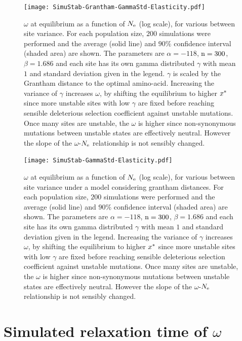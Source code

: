 \begin{figure}[H]
	\centering
	\texttt{[image: SimuStab-Grantham-GammaStd-Elasticity.pdf]}
	\caption[Effect of site variance on the susceptibility]{
	$\omega$ at equilibrium as a function of $N_{\mathrm{e}}$ (log scale), for various between site variance.
	For each population size, $200$ simulations were performed and the average (solid line) and $90\%$ confidence interval (shaded area) are shown.
	The parameters are $\alpha=-118$, $\text{n}=300$, $\beta=1.686$ and each site has its own gamma distributed $\gamma$ with mean $1$ and standard deviation given in the legend. $\gamma$ is scaled by the Grantham distance to the optimal amino-acid.
	Increasing the variance of $\gamma$ increases $\omega$, by shifting the equilibrium to higher $x^{*}$ since more unstable sites with low $\gamma$ are fixed before reaching sensible deleterious selection coefficient against unstable mutations. Once many sites are unstable, the $\omega$ is higher since non-synonymous mutations between unstable states are effectively \gls{neutral}. However the slope of the $\omega$-$N_{\mathrm{e}}$ relationship is not sensibly changed.
	}
\end{figure}

\begin{figure}[H]
	\centering
	\texttt{[image: SimuStab-GammaStd-Elasticity.pdf]}
	\caption[Effect of site variance on the susceptibility without grantham distance]{
	$\omega$ at equilibrium as a function of $N_{\mathrm{e}}$ (log scale), for various between site variance under a model considering grantham distances.
	For each population size, $200$ simulations were performed and the average (solid line) and $90\%$ confidence interval (shaded area) are shown.
	The parameters are $\alpha=-118$, $\text{n}=300$, $\beta=1.686$ and each site has its own gamma distributed $\gamma$ with mean $1$ and standard deviation given in the legend.
	Increasing the variance of $\gamma$ increases $\omega$, by shifting the equilibrium to higher $x^{*}$ since more unstable sites with low $\gamma$ are fixed before reaching sensible deleterious selection coefficient against unstable mutations. Once many sites are unstable, the $\omega$ is higher since non-synonymous mutations between unstable states are effectively \gls{neutral}. However the slope of the $\omega$-$N_{\mathrm{e}}$ relationship is not sensibly changed.
	}
\end{figure}

\section{Simulated relaxation time of \texorpdfstring{$\omega$}{ω}}

